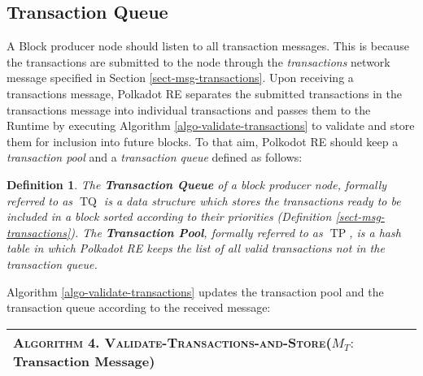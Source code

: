 \documentclass{book}
\newcommand{\tmem}[1]{{\em #1\/}}
\newcommand{\tmname}[1]{\textsc{#1}}
\newcommand{\tmop}[1]{\ensuremath{\operatorname{#1}}}
\newcommand{\tmstrong}[1]{\textbf{#1}}
\newcommand{\tmtextbf}[1]{{\bfseries{#1}}}
\newcommand{\tmtextit}[1]{{\itshape{#1}}}
\newcommand{\tmtextsc}[1]{{\scshape{#1}}}
\newcounter{tmcounter}
\newcommand{\custombinding}[1]{%
  \setcounter{tmcounter}{#1}%
  \addtocounter{tmcounter}{-1}%
  \refstepcounter{tmcounter}}
\newtheorem{definition}{Definition}
\providecommand{\tmem}[1]{\tmtextit{#1}}
\providecommand{\tmname}[1]{\tmtextsc{#1}}
\providecommand{\tmop}[1]{\ensuremath{\mathrm{#1}}}
\providecommand{\tmstrong}[1]{\tmtextbf{#1}}
\providecommand{\tmtextbf}[1]{\tmtextbf{#1}}
\providecommand{\tmtextit}[1]{\tmtextit{#1}}
\newtheorem{definition}{Definition}
\begin{document}
\subsection{Transaction Queue}

A Block producer node should listen to all transaction
messages{\tmem{{}}}. This is because the
transactions are submitted to the node through the {\tmem{transactions}}
network message specified in Section \ref{sect-msg-transactions}. Upon
receiving a transactions message, Polkadot RE separates the submitted
transactions in the transactions message into individual transactions and
passes them to the Runtime by executing Algorithm
\ref{algo-validate-transactions} to validate and store them for inclusion into
future blocks. To that aim, Polkodot RE should keep a {\tmem{transaction
pool{}}} and a {\tmem{transaction
queue}}{} defined as follows:

\begin{definition}
  \label{defn-transaction-queue}The {\tmstrong{Transaction Queue}} of a block
  producer node, formally referred to as $\tmop{TQ}$ is a data structure which
  stores the transactions ready to be included in a block sorted according to
  their priorities (Definition \ref{sect-msg-transactions}). The
  {\tmstrong{Transaction Pool}}, formally referred to as $\tmop{TP}$, is a
  hash table in which Polkadot RE keeps the list of all valid transactions not
  in the transaction queue.
\end{definition}

Algorithm \ref{algo-validate-transactions} updates the transaction pool and
the transaction queue according to the received message:

\custombinding{4}{\noindent}\begin{tabular}{l}
  \hline
  \tmtextsc{Algorithm  4. }
  \label{algo-validate-transactions}{\tmname{Validate-Transactions-and-Store}}($M_T
  :$Transaction Message)\\
  \hline
\end{tabular}
\end{document}
